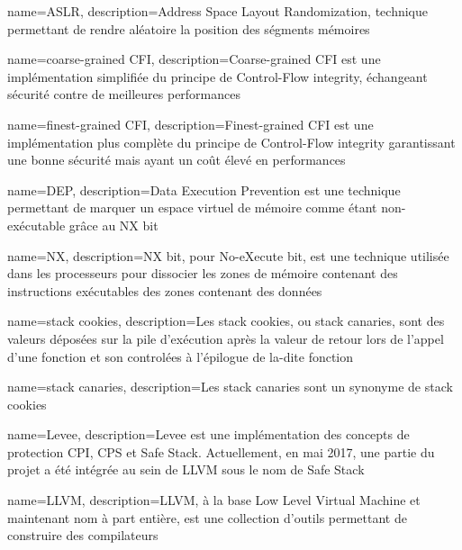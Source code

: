 


{
	name=ASLR,
	description={Address Space Layout Randomization, technique permettant de rendre aléatoire la position des ségments mémoires}
}

{
	name=coarse-grained CFI,
	description={Coarse-grained CFI est une implémentation simplifiée du principe de Control-Flow integrity, échangeant sécurité contre de meilleures performances}
}

{
	name=finest-grained CFI,
	description={Finest-grained CFI est une implémentation plus complète du principe de Control-Flow integrity garantissant une bonne sécurité mais ayant un coût élevé en performances}
}

{
	name=DEP,
	description={Data Execution Prevention est une technique permettant de marquer un espace virtuel de mémoire comme étant non-exécutable grâce au NX bit}
}

{
	name=NX,
	description={NX bit, pour No-eXecute bit, est une technique utilisée dans les processeurs pour dissocier les zones de mémoire contenant des instructions exécutables des zones contenant des données}
}

{
	name={stack cookies},
	description={Les stack cookies, ou stack canaries, sont des valeurs déposées sur la pile d'exécution après la valeur de retour lors de l'appel d'une fonction et son controlées à l'épilogue de la-dite fonction}
}

{
	name={stack canaries},
	description={Les stack canaries sont un synonyme de stack cookies}
}

{
	name={Levee},
	description={Levee est une implémentation des concepts de protection CPI, CPS et Safe Stack. Actuellement, en mai 2017, une partie du projet a été intégrée au sein de LLVM sous le nom de Safe Stack}
}

{
	name={LLVM},
	description={LLVM, à la base Low Level Virtual Machine et maintenant nom à part entière, est une collection d'outils permettant de construire des compilateurs}
}

